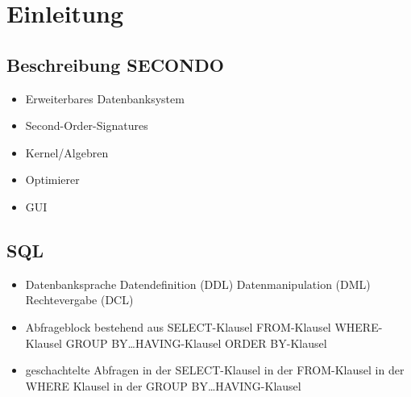 %
%
%

\chapter{Einleitung}


\section{Beschreibung SECONDO}
\begin{itemize}
	\item Erweiterbares Datenbanksystem
	\item Second-Order-Signatures
	\item Kernel/Algebren
	\item Optimierer
	\item GUI
\end{itemize}

\section{SQL}
\begin{itemize}
	\item Datenbanksprache
	\subitem Datendefinition (DDL)
	\subitem Datenmanipulation (DML)
	\subitem Rechtevergabe (DCL)
	\item Abfrageblock bestehend aus 
	\subitem SELECT-Klausel
	\subitem FROM-Klausel
	\subitem WHERE-Klausel
	\subitem GROUP BY\dots HAVING-Klausel
	\subitem ORDER BY-Klausel
	\item geschachtelte Abfragen
	\subitem in der SELECT-Klausel
	\subitem in der FROM-Klausel
	\subitem in der WHERE Klausel
	\subitem in der GROUP BY\dots HAVING-Klausel
\end{itemize}


%
%
%